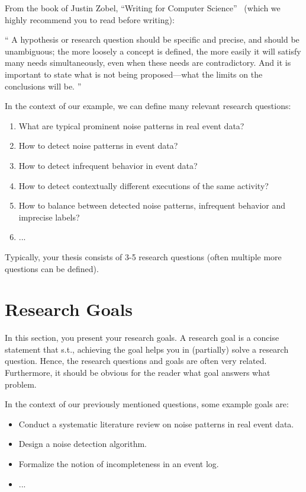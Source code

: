 From the book of Justin Zobel, \enquote{Writing for Computer Science}~\cite{DBLP:books/sp/Zobel14} (which we highly recommend you to read before writing):

\enquote{
	A hypothesis or research question should be specific and precise, and should be
	unambiguous; the more loosely a concept is defined, the more easily it will satisfy
	many needs simultaneously, even when these needs are contradictory. And it is
	important to state what is not being proposed—what the limits on the conclusions
	will be.
}

In the context of our example, we can define many relevant research questions:
\begin{enumerate}
	\item What are typical prominent noise patterns in real event data?
	\item How to detect noise patterns in event data?
	\item How to detect infrequent behavior in event data?
	\item How to detect contextually different executions of the same activity?
	\item How to balance between detected noise patterns, infrequent behavior and imprecise labels?
	\item ...
\end{enumerate}
Typically, your thesis consists of 3-5 research questions (often multiple more questions can be defined).

\section{Research Goals}
In this section, you present your research goals.
A research goal is a concise statement that s.t., achieving the goal helps you in (partially) solve a research question.
Hence, the research questions and goals are often very related.
Furthermore, it should be obvious for the reader what goal answers what problem.

In the context of our previously mentioned questions, some example goals are:
\begin{itemize}
	\item Conduct a systematic literature review on noise patterns in real event data.
	\item Design a noise detection algorithm.
	\item Formalize the notion of incompleteness in an event log.
	\item ...
\end{itemize}

